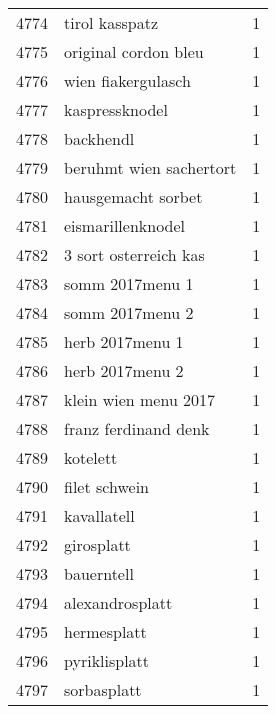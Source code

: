 \begin{tabular}{llr}
4774 &                                     tirol kasspatz &      1 \\
4775 &                               original cordon bleu &      1 \\
4776 &                                 wien fiakergulasch &      1 \\
4777 &                                     kaspressknodel &      1 \\
4778 &                                          backhendl &      1 \\
4779 &                            beruhmt wien sachertort &      1 \\
4780 &                                 hausgemacht sorbet &      1 \\
4781 &                                  eismarillenknodel &      1 \\
4782 &                              3 sort osterreich kas &      1 \\
4783 &                                    somm 2017menu 1 &      1 \\
4784 &                                    somm 2017menu 2 &      1 \\
4785 &                                    herb 2017menu 1 &      1 \\
4786 &                                    herb 2017menu 2 &      1 \\
4787 &                               klein wien menu 2017 &      1 \\
4788 &                               franz ferdinand denk &      1 \\
4789 &                                           kotelett &      1 \\
4790 &                                      filet schwein &      1 \\
4791 &                                        kavallatell &      1 \\
4792 &                                         girosplatt &      1 \\
4793 &                                         bauerntell &      1 \\
4794 &                                    alexandrosplatt &      1 \\
4795 &                                        hermesplatt &      1 \\
4796 &                                      pyriklisplatt &      1 \\
4797 &                                        sorbasplatt &      1 \\

\end{tabular}
